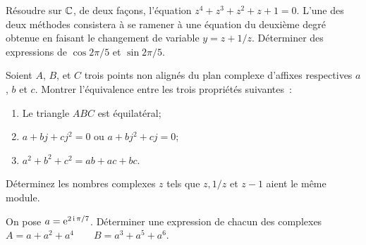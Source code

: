                                 \begin{exercice}
                                  Résoudre sur \(\mathbb{C}\), de deux façons, l'équation \(z^4 + z^3 + z^2 + z + 1 = 
                                  0\). L'une des deux méthodes consistera à se ramener à une équation du 
                                  deuxième degré obtenue en faisant le changement de variable \(y = z + 1/z\).  
                                  Déterminer des expressions de \(\cos 2\pi/5\) et \(\sin 2\pi/5\).
                                \end{exercice}

                                \begin{exercice}
                                  Soient \(A\), \(B\), et \(C\) trois points non alignés du plan complexe 
                                  d'affixes respectives \(a\), \(b\) et \(c\). Montrer l'équivalence entre les 
                                  trois propriétés suivantes~:
                                  \begin{enumerate}
                                    \item Le triangle \(ABC\) est équilatéral;
                                    \item \(a + bj + cj^2 = 0\) ou \(a + bj^2 + cj = 0\);
                                    \item \(a^2 + b^2 + c^2 = ab + ac + bc\).
                                  \end{enumerate}
                                \end{exercice}

                                \begin{exercice}
                                  Déterminez les nombres complexes \(z\) tels que \(z, 1/z\) et \(z-1\) aient 
                                  le même module.
                                \end{exercice}

                                \begin{exercice}
                                  On pose \(a = \operatorname{e}^{2\operatorname{i}\pi/7}\). Déterminer une expression de chacun des 
                                  complexes \(A = a + a^2 + a^4 \qquad B = a^3 + a^5 + a^6\).
                                \end{exercice}

